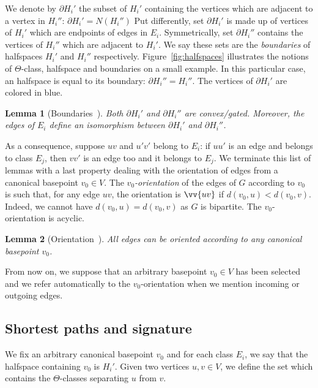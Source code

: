 \documentclass{article}
\newtheorem{lemma}{Lemma}
\begin{document}
We denote by $\partial H_i'$ the subset of $H_i'$ containing the vertices which are adjacent to a vertex in $H_i''$: $\partial H_i' = N(H_i'')$ Put differently, set $\partial H_i'$ is made up of vertices of $H_i'$ which are endpoints of edges in $E_i$. Symmetrically, set $\partial H_i''$ contains the vertices of $H_i''$ which are adjacent to $H_i'$. We say these sets are the \textit{boundaries} of halfspaces $H_i'$ and $H_i''$ respectively. Figure~\ref{fig:halfspaces} illustrates the notions of $\Theta$-class, halfspace and boundaries on a small example. In this particular case, an halfspace is equal to its boundary: $\partial H_i'' = H_i''$. The vertices of $\partial H_i'$ are colored in blue.

\begin{lemma}[Boundaries~\cite{BeChChVa20,HaImKl99,Mu80}]
Both $\partial H_i'$ and $\partial H_i''$ are convex/gated. Moreover, the edges of $E_i$ define an isomorphism between $\partial H_i'$ and $\partial H_i''$.
\label{le:boundaries}
\end{lemma}


As a consequence, suppose $uv$ and $u'v'$ belong to $E_i$: if $uu'$ is an edge and belongs to class $E_j$, then $vv'$ is an edge too and it belongs to $E_j$. We terminate this list of lemmas with a last property dealing with the orientation of edges  from a canonical basepoint $v_0 \in V$. The \textit{$v_0$-orientation} of the edges of $G$ according to $v_0$ is such that, for any edge $uv$, the orientation is $\vv{uv}$ if $d(v_0,u) < d(v_0,v)$. Indeed, we cannot have $d(v_0,u) = d(v_0,v)$ as $G$ is bipartite. The $v_0$-orientation is acyclic.

\begin{lemma}[Orientation~\cite{BeChChVa20}]
All edges can be oriented according to any canonical basepoint $v_0$.
\end{lemma}

From now on, we suppose that an arbitrary basepoint $v_0 \in V$ has been selected and we refer automatically to the $v_0$-orientation when we mention incoming or outgoing edges.

\subsection{Shortest paths and signature} \label{subsec:signature}

We fix an arbitrary canonical basepoint $v_0$ and for each class $E_i$, we say that the halfspace containing $v_0$ is $H_i'$.
Given two vertices $u,v \in V$, we define the set which contains the $\Theta$-classes separating $u$ from $v$.
\end{document}
